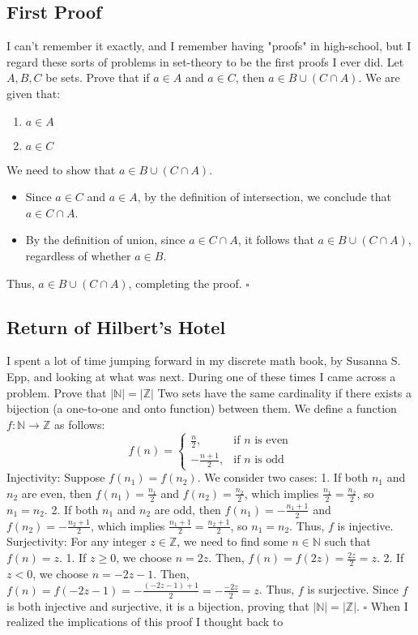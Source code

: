 \documentclass{article}
\begin{document}
\subsection*{First Proof}
I can't remember it exactly, and I remember having "proofs" in high-school, but I regard these sorts of problems in set-theory to be the first proofs I ever did.
Let \( A, B, C \) be sets. Prove that if \( a \in A \) and \( a \in C \), then \( a \in B \cup (C \cap A) \).
We are given that:
\begin{enumerate}
    \item \( a \in A \)
    \item \( a \in C \)
\end{enumerate}
We need to show that \( a \in B \cup (C \cap A) \).
\begin{itemize}
    \item Since \( a \in C \) and \( a \in A \), by the definition of intersection, we conclude that \( a \in C \cap A \).
    \item By the definition of union, since \( a \in C \cap A \), it follows that \( a \in B \cup (C \cap A) \), regardless of whether \( a \in B \).
\end{itemize}
Thus, \( a \in B \cup (C \cap A) \), completing the proof. \(\square\)

\subsection*{Return of Hilbert's Hotel}
I spent a lot of time jumping forward in my discrete math book, by Susanna S. Epp, and looking at what was next.
During one of these times I came across a problem.
Prove that \( |\mathbb{N}| = |\mathbb{Z}| \)
Two sets have the same cardinality if there exists a bijection (a one-to-one and onto function) between them. We define a function \( f: \mathbb{N} \to \mathbb{Z} \) as follows:
\[
f(n) =
\begin{cases} 
\frac{n}{2}, & \text{if } n \text{ is even} \\ 
-\frac{n+1}{2}, & \text{if } n \text{ is odd} 
\end{cases}
\]
Injectivity:
Suppose \( f(n_1) = f(n_2) \). We consider two cases:
1. If both \( n_1 \) and \( n_2 \) are even, then \( f(n_1) = \frac{n_1}{2} \) and \( f(n_2) = \frac{n_2}{2} \), which implies \( \frac{n_1}{2} = \frac{n_2}{2} \), so \( n_1 = n_2 \).
2. If both \( n_1 \) and \( n_2 \) are odd, then \( f(n_1) = -\frac{n_1+1}{2} \) and \( f(n_2) = -\frac{n_2+1}{2} \), which implies \( \frac{n_1+1}{2} = \frac{n_2+1}{2} \), so \( n_1 = n_2 \).
Thus, \( f \) is injective.
Surjectivity:
For any integer \( z \in \mathbb{Z} \), we need to find some \( n \in \mathbb{N} \) such that \( f(n) = z \).
1. If \( z \geq 0 \), we choose \( n = 2z \). Then, \( f(n) = f(2z) = \frac{2z}{2} = z \).
2. If \( z < 0 \), we choose \( n = -2z - 1 \). Then, \( f(n) = f(-2z - 1) = -\frac{(-2z - 1) + 1}{2} = -\frac{-2z}{2} = z \).
Thus, \( f \) is surjective.
Since \( f \) is both injective and surjective, it is a bijection, proving that \( |\mathbb{N}| = |\mathbb{Z}| \). \(\square\)
\break
When I realized the implications of this proof I thought back to    
\end{document}
